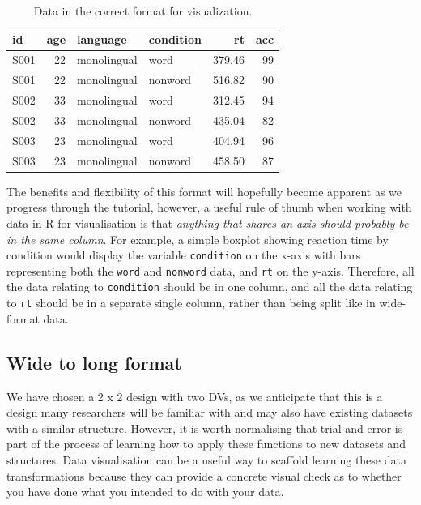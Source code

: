 \documentclass[
  english,
  doc,floatsintext]{apa6}
\begin{document}
\begin{table}

\caption{\label{tab:long}Data in the correct format for visualization.}
\centering
\begin{tabular}[t]{l|r|l|l|r|r}
\hline
id & age & language & condition & rt & acc\\
\hline
S001 & 22 & monolingual & word & 379.46 & 99\\
\hline
S001 & 22 & monolingual & nonword & 516.82 & 90\\
\hline
S002 & 33 & monolingual & word & 312.45 & 94\\
\hline
S002 & 33 & monolingual & nonword & 435.04 & 82\\
\hline
S003 & 23 & monolingual & word & 404.94 & 96\\
\hline
S003 & 23 & monolingual & nonword & 458.50 & 87\\
\hline
\end{tabular}
\end{table}

The benefits and flexibility of this format will hopefully become apparent as we progress through the tutorial, however, a useful rule of thumb when working with data in R for visualisation is that \emph{anything that shares an axis should probably be in the same column}. For example, a simple boxplot showing reaction time by condition would display the variable \texttt{condition} on the x-axis with bars representing both the \texttt{word} and \texttt{nonword} data, and \texttt{rt} on the y-axis. Therefore, all the data relating to \texttt{condition} should be in one column, and all the data relating to \texttt{rt} should be in a separate single column, rather than being split like in wide-format data.

\hypertarget{wide-to-long-format}{%
\subsection{Wide to long format}\label{wide-to-long-format}}

We have chosen a 2 x 2 design with two DVs, as we anticipate that this is a design many researchers will be familiar with and may also have existing datasets with a similar structure. However, it is worth normalising that trial-and-error is part of the process of learning how to apply these functions to new datasets and structures. Data visualisation can be a useful way to scaffold learning these data transformations because they can provide a concrete visual check as to whether you have done what you intended to do with your data.
\end{document}
